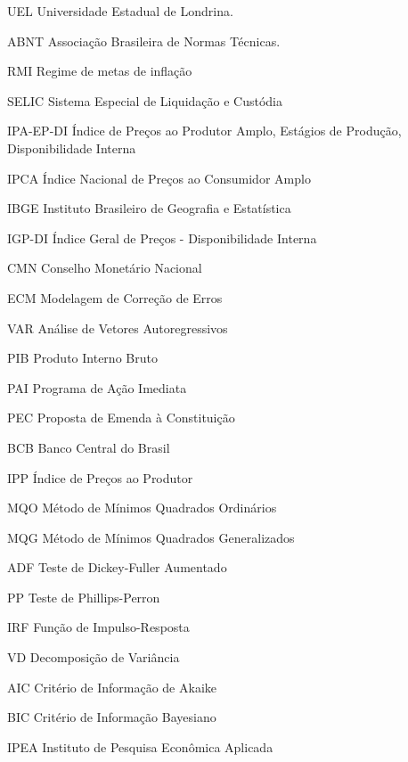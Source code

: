\documentclass[12pt,oneside,a4paper,chapter=TITLE,english,brazil,sumario=abnt-6027-2012]{abntex2}
\begin{document}
\listoffigures*
\cleardoublepage


\listoftables*
\cleardoublepage


\begin{siglas}
	\item[UEL] Universidade Estadual de Londrina. 
	\item[ABNT] Associação Brasileira de Normas Técnicas.
	\item[RMI] Regime de metas de inflação
	\item[SELIC] Sistema Especial de Liquidação e Custódia
	\item[IPA-EP-DI] Índice de Preços ao Produtor Amplo, Estágios de Produção, Disponibilidade Interna
	\item[IPCA] Índice Nacional de Preços ao Consumidor Amplo
	\item[IBGE] Instituto Brasileiro de Geografia e Estatística
	\item[IGP-DI] Índice Geral de Preços - Disponibilidade Interna
	\item[CMN] Conselho Monetário Nacional
	\item[ECM] Modelagem de Correção de Erros
	\item[VAR] Análise de Vetores Autoregressivos
	\item[PIB] Produto Interno Bruto
	\item[PAI] Programa de Ação Imediata
	\item[PEC] Proposta de Emenda à Constituição
	\item[BCB] Banco Central do Brasil
	\item[IPP] Índice de Preços ao Produtor
	\item[MQO] Método de Mínimos Quadrados Ordinários
	\item[MQG] Método de Mínimos Quadrados Generalizados
	\item[ADF] Teste de Dickey-Fuller Aumentado
	\item[PP] Teste de Phillips-Perron
	\item[IRF] Função de Impulso-Resposta
	\item[VD]  Decomposição de Variância
	\item[AIC] Critério de Informação de Akaike
	\item[BIC] Critério de Informação Bayesiano
	\item[IPEA] Instituto de Pesquisa Econômica Aplicada
\end{siglas}
\pagebreak
\end{document}
